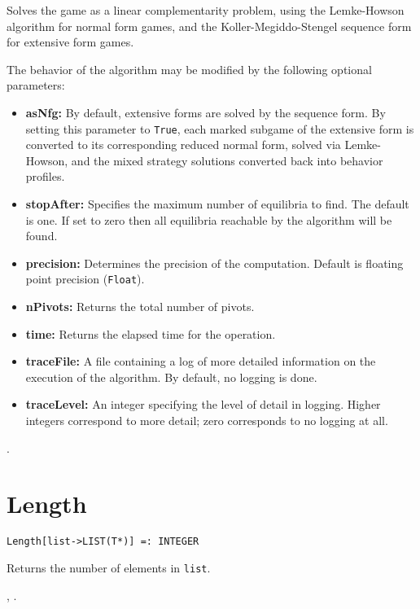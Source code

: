 \noindent
Solves the game as a linear complementarity problem, using the
Lemke-Howson algorithm for normal form games, and the
Koller-Megiddo-Stengel sequence form for extensive form games.  

The behavior of the algorithm may be modified by the following
optional parameters:
\begin{itemize}
\item
\textbf{asNfg:} By default, extensive forms are solved by the sequence form.
By setting this parameter to \verb+True+, each marked subgame of the extensive
form is converted to its corresponding reduced normal form, solved
via Lemke-Howson, and the mixed strategy solutions converted back into
behavior profiles.
\item
\textbf{stopAfter:} Specifies the maximum number of equilibria to find.  The
default is one. If set to zero then all equilibria reachable by the
algorithm will be found.
\item
\textbf{precision:} Determines the precision of the computation. Default is
floating point precision (\verb+Float+). 
\item
\textbf{nPivots:} Returns the total number of pivots. 
\item
\textbf{time:} Returns the elapsed time for the operation.
\item
\textbf{traceFile:} A file containing a log of more detailed information on the
execution of the algorithm.  By default, no logging is done.
\item
\textbf{traceLevel:} An integer specifying the level of detail in logging.
Higher integers correspond to more detail; zero corresponds to no
logging at all.
\end{itemize}

\seealso {}.


\section*{Length}\label{PrimLength}
\begin{verbatim}
Length[list->LIST(T*)] =: INTEGER
\end{verbatim}
\foralltypes

\noindent
Returns the number of elements in \verb+list+.

\seealso {},
.

